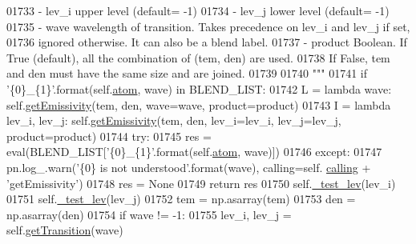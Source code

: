 \begin{DoxyCode}
{{01733 \textcolor{stringliteral}{            - lev\_i    upper level (default= -1)}
01734 \textcolor{stringliteral}{            - lev\_j    lower level (default= -1)}
01735 \textcolor{stringliteral}{            - wave     wavelength of transition. Takes precedence on lev\_i and lev\_j if set, }
01736 \textcolor{stringliteral}{                        ignored otherwise. It can also be a blend label.}
01737 \textcolor{stringliteral}{            - product  Boolean. If True (default), all the combination of (tem, den) are used. }
01738 \textcolor{stringliteral}{                         If False, tem and den must have the same size and are joined.}
01739 \textcolor{stringliteral}{}
01740 \textcolor{stringliteral}{        """}
01741         \textcolor{keywordflow}{if} \textcolor{stringliteral}{'\{0\}\_\{1\}'}.format(self.\hyperlink{classpyneb_1_1core_1_1pynebcore_1_1_atom_a192f3e20446d7fba81d789bc705d6c71}{atom}, wave) \textcolor{keywordflow}{in} BLEND\_LIST:
01742             L = \textcolor{keyword}{lambda} wave: self.\hyperlink{classpyneb_1_1core_1_1pynebcore_1_1_atom_aaf4e84a9d5f835e6284bd9302314f775}{getEmissivity}(tem, den, wave=wave, product=product)
01743             I = \textcolor{keyword}{lambda} lev\_i, lev\_j: self.\hyperlink{classpyneb_1_1core_1_1pynebcore_1_1_atom_aaf4e84a9d5f835e6284bd9302314f775}{getEmissivity}(tem, den, lev\_i=lev\_i, lev\_j=lev\_j, 
      product=product)
01744             \textcolor{keywordflow}{try}:
01745                 res = eval(BLEND\_LIST[\textcolor{stringliteral}{'\{0\}\_\{1\}'}.format(self.\hyperlink{classpyneb_1_1core_1_1pynebcore_1_1_atom_a192f3e20446d7fba81d789bc705d6c71}{atom}, wave)])
01746             \textcolor{keywordflow}{except}:
01747                 pn.log\_.warn(\textcolor{stringliteral}{'\{0\} is not understood'}.format(wave), calling=self.
      \hyperlink{classpyneb_1_1core_1_1pynebcore_1_1_atom_a373b7735acf4f528b54bddf373ad67a1}{calling} + \textcolor{stringliteral}{'getEmissivity'})
01748                 res = \textcolor{keywordtype}{None}
01749             \textcolor{keywordflow}{return} res
01750         self.\hyperlink{classpyneb_1_1core_1_1pynebcore_1_1_atom_ade3de73e8bdb814d01d2d9af98eba87f}{\_test\_lev}(lev\_i)
01751         self.\hyperlink{classpyneb_1_1core_1_1pynebcore_1_1_atom_ade3de73e8bdb814d01d2d9af98eba87f}{\_test\_lev}(lev\_j)
01752         tem = np.asarray(tem)
01753         den = np.asarray(den)
01754         \textcolor{keywordflow}{if} wave != -1:
01755             lev\_i, lev\_j = self.\hyperlink{classpyneb_1_1core_1_1pynebcore_1_1_atom_a7c9f17a3d9e841267add92377d9d1ede}{getTransition}(wave)
}}
\end{DoxyCode}
